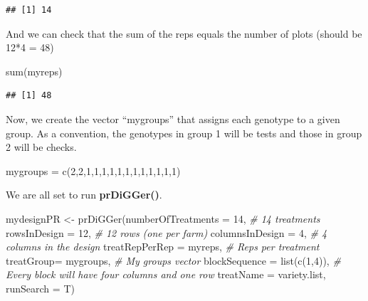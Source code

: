 \documentclass[
]{book}
\newenvironment{Shaded}{\begin{snugshade}}{\end{snugshade}}
\newcommand{\AttributeTok}[1]{\textcolor[rgb]{0.77,0.63,0.00}{#1}}
\newcommand{\CommentTok}[1]{\textcolor[rgb]{0.56,0.35,0.01}{\textit{#1}}}
\newcommand{\DecValTok}[1]{\textcolor[rgb]{0.00,0.00,0.81}{#1}}
\newcommand{\FunctionTok}[1]{\textcolor[rgb]{0.00,0.00,0.00}{#1}}
\newcommand{\NormalTok}[1]{#1}
\newcommand{\OtherTok}[1]{\textcolor[rgb]{0.56,0.35,0.01}{#1}}
\begin{document}
\begin{verbatim}
## [1] 14
\end{verbatim}

And we can check that the sum of the reps equals the number of plots (should be 12*4 = 48)

\begin{Shaded}
\begin{Highlighting}[]
\FunctionTok{sum}\NormalTok{(myreps) }
\end{Highlighting}
\end{Shaded}

\begin{verbatim}
## [1] 48
\end{verbatim}

Now, we create the vector ``mygroups'' that assigns each genotype to a given group. As a convention, the genotypes in group 1 will be tests and those in group 2 will be checks.

\begin{Shaded}
\begin{Highlighting}[]
\NormalTok{mygroups }\OtherTok{=}  \FunctionTok{c}\NormalTok{(}\DecValTok{2}\NormalTok{,}\DecValTok{2}\NormalTok{,}\DecValTok{1}\NormalTok{,}\DecValTok{1}\NormalTok{,}\DecValTok{1}\NormalTok{,}\DecValTok{1}\NormalTok{,}\DecValTok{1}\NormalTok{,}\DecValTok{1}\NormalTok{,}\DecValTok{1}\NormalTok{,}\DecValTok{1}\NormalTok{,}\DecValTok{1}\NormalTok{,}\DecValTok{1}\NormalTok{,}\DecValTok{1}\NormalTok{,}\DecValTok{1}\NormalTok{)}
\end{Highlighting}
\end{Shaded}

We are all set to run \textbf{prDiGGer()}.

\begin{Shaded}
\begin{Highlighting}[]
\NormalTok{mydesignPR }\OtherTok{\textless{}{-}} \FunctionTok{prDiGGer}\NormalTok{(}\AttributeTok{numberOfTreatments =} \DecValTok{14}\NormalTok{,                  }\CommentTok{\# 14 treatments}
                       \AttributeTok{rowsInDesign =} \DecValTok{12}\NormalTok{,                        }\CommentTok{\# 12 rows (one per farm)}
                       \AttributeTok{columnsInDesign =} \DecValTok{4}\NormalTok{,                      }\CommentTok{\# 4 columns in the design}
                       \AttributeTok{treatRepPerRep =}\NormalTok{ myreps,                  }\CommentTok{\# Reps per treatment}
                       \AttributeTok{treatGroup=}\NormalTok{ mygroups,                     }\CommentTok{\# My groups vector}
                       \AttributeTok{blockSequence =} \FunctionTok{list}\NormalTok{(}\FunctionTok{c}\NormalTok{(}\DecValTok{1}\NormalTok{,}\DecValTok{4}\NormalTok{)),             }\CommentTok{\# Every block will have four columns and one row}
                       \AttributeTok{treatName =}\NormalTok{ variety.list,}
                       \AttributeTok{runSearch =}\NormalTok{ T)        }
\end{Highlighting}
\end{Shaded}
\end{document}
